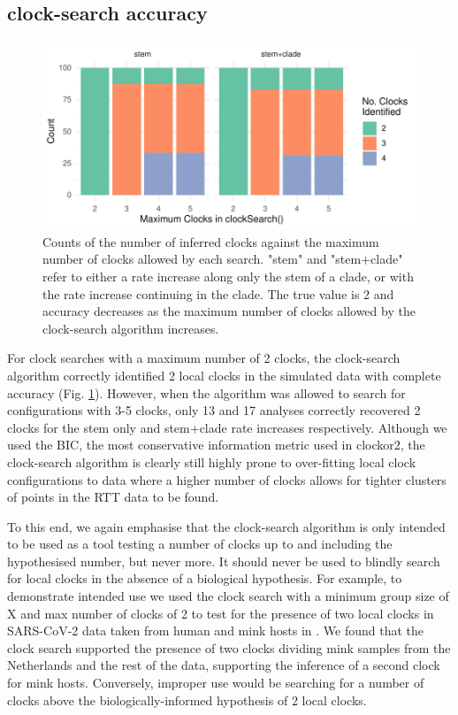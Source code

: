 \documentclass{article}
\begin{document}
\subsection*{clock-search accuracy}
\begin{figure}[H]
\centering
\includegraphics[width = \linewidth]{figures/inferredClocks.pdf}
\caption{Counts of the number of inferred clocks against the maximum number of clocks allowed by each search. "stem" and "stem+clade" refer to either a rate increase along only the stem of a clade, or with the rate increase continuing in the clade. The true value is 2 and accuracy decreases as the maximum number of clocks allowed by the clock-search algorithm increases.}
\label{fig:simStudy}
\end{figure}

For clock searches with a maximum number of 2 clocks, the clock-search algorithm correctly identified 2 local clocks in the simulated data with complete accuracy (Fig. \ref{fig:simStudy}). However, when the algorithm was allowed to search for configurations with 3-5 clocks, only 13 and 17 analyses correctly recovered 2 clocks for the stem only and stem+clade rate increases respectively. Although we used the BIC, the most conservative information metric used in clockor2, the clock-search algorithm is clearly still highly prone to over-fitting local clock configurations to data where a higher number of clocks allows for tighter clusters of points in the RTT data to be found.

To this end, we again emphasise that the clock-search algorithm is only intended to be used as a tool testing a number of clocks up to and including the hypothesised number, but never more. It should never be used to blindly search for local clocks in the absence of a biological hypothesis. For example, to demonstrate intended use we used the clock search with a minimum group size of X and max number of clocks of 2 to test for the presence of two local clocks in SARS-CoV-2 data taken from human and mink hosts in \citet{porter2023evolutionary}. We found that the clock search supported the presence of two clocks dividing mink samples from the Netherlands and the rest of the data, supporting the inference of a second clock for mink hosts. Conversely, improper use would be searching for a number of clocks above the biologically-informed hypothesis of 2 local clocks.
\end{document}
